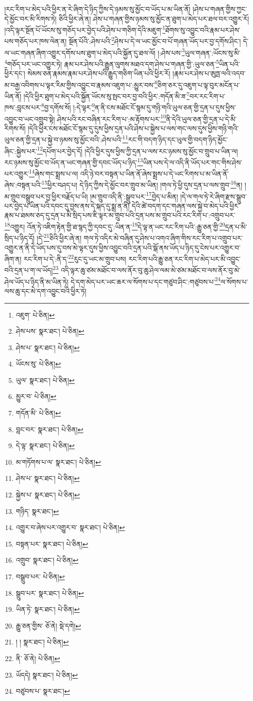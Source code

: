 །རང་རིག་པ་མེད་པའི་ཕྱིར་ན་རེ་ཞིག་དེ་ཉིད་ཀྱིས་དེ་ཉམས་སུ་མྱོང་བ་ཡོད་པ་མ་ཡིན་ནོ། །ཤེས་པ་གཞན་གྱིས་ཀྱང་དེ་མྱོང་བར་མི་རིགས་ཏེ། ཅིའི་ཕྱིར་ཞེ་ན། ཤེས་པ་གཞན་གྱིས་ཉམས་སུ་མྱོང་ན་ཐུག་པ་མེད་པར་ཐལ་བར་འགྱུར་རོ། །འདི་ལྟར་སྔོན་པོ་ཡོངས་སུ་གཅོད་པར་བྱེད་པའི་ཤེས་པ་གཅིག་དེའི་མཇུག་\footnote{འཇུག་  པེ་ཅིན། }ཐོགས་སུ་འབྱུང་བའི་རྣམ་པར་ཤེས་པས་གཅོད་པར་ཁས་ལེན་ན། སྔོན་པོའི་:ཤེས་པའི་\footnote{ཤེས་པས་  སྣར་ཐང་།  པེ་ཅིན། }ཤེས་པ་དེ་ལ་ཡང་མྱོང་བ་པོ་གཞན་ཡོད་པར་བྱ་དགོས་ཤིང་། དེ་ལ་ཡང་གཞན་ཞིག་འགྱུར་དགོས་པས་ཐུག་པ་མེད་པའི་སྐྱོན་དུ་ཐལ་ལོ། །:ཤེས་པས་\footnote{ཤེས་པ་  སྣར་ཐང་།  པེ་ཅིན། }ཡུལ་གཞན་:ཡོངས་སུ་མི་\footnote{ཡོངས་སུ་  པེ་ཅིན། }གཅོད་པར་ཡང་འགྱུར་ཏེ། རྣམ་པར་ཤེས་པའི་རྒྱུན་ལུགས་མཐའ་དག་ཤེས་པ་གཞན་གྱི་:ཡུལ་ཅན་\footnote{ཡུལ་  སྣར་ཐང་།  པེ་ཅིན། }ཡིན་པའི་ཕྱིར་དང་། སེམས་ཅན་རྣམས་རྣམ་པར་ཤེས་པའི་རྒྱུད་གཅིག་ཡིན་པའི་ཕྱིར་རོ། །རྣམ་པར་ཤེས་པ་ཨུཏྤ་ལའི་འདབ་མ་བརྒྱ་འབིགས་པ་ལྟར་རིམ་གྱིས་འབྱུང་བ་རྣམས་འཇུག་པ་:མྱུར་བས་\footnote{མྱུར་བ་  པེ་ཅིན། }ཅིག་ཅར་དུ་འཇུག་པ་ལྟ་བུར་མངོན་པ་ཡིན་ནོ། །དེའི་ཕྱིར་ཐུག་པ་མེད་པའི་སྐྱོན་ཡོངས་སུ་སྤང་བར་བྱ་བའི་ཕྱིར་:གདོན་མི་ཟ་\footnote{གདོན་མི་  པེ་ཅིན། }བར་རང་རིག་པ་ཁས་:བླངས་པར་\footnote{བླང་བར་  སྣར་ཐང་།  པེ་ཅིན། }བྱ་དགོས་སོ། །:དེ་ལྟར་\footnote{དེ་ལྟ་  སྣར་ཐང་།  པེ་ཅིན། }ན་ནི་ངས་མཐོང་ངོ་སྙམ་དུ་གཉི་གའི་ཡུལ་ཅན་གྱི་དྲན་པ་དུས་ཕྱིས་འབྱུང་བ་ཡང་འགྲུབ་སྟེ། ཤེས་པའི་རང་བཞིན་རང་རིག་པ་:མ་རྟོགས་པར་\footnote{མ་གཏོགས་པ་ལ་  སྣར་ཐང་།  པེ་ཅིན། }ནི་དེའི་ཡུལ་ཅན་གྱི་དྲན་པ་དེ་མི་རིགས་སོ། །དེའི་ཕྱིར་ངས་མཐོང་ངོ་སྙམ་དུ་དུས་ཕྱིས་དྲན་པའི་ཤེས་པ་སྐྱེས་པ་ལས་གང་ལས་དུས་ཕྱིས་གཉི་གའི་ཡུལ་ཅན་གྱི་དྲན་པ་སྐྱེ་བ་ཉམས་སུ་མྱོང་བའི་:ཤེས་པའི་\footnote{ཤེས་པ་  སྣར་ཐང་།  པེ་ཅིན། }རང་གི་བདག་ཉིད་དང་ཡུལ་གྱི་བདག་ཉིད་མྱོང་ཞིང་:སྐྱེས་པར་\footnote{སྐྱེས་པ་  སྣར་ཐང་།  པེ་ཅིན། }དཔོག་པར་བྱེད་དོ། །དེའི་ཕྱིར་དུས་ཕྱིས་ཀྱི་དྲན་པ་ལས་རང་ཉམས་སུ་མྱོང་བ་གྲུབ་པ་ཡིན་ལ། རང་ཉམས་སུ་མྱོང་བ་ཡོད་ན་ཡང་གཞན་གྱི་དབང་ཡོད་པ་ཉིད་\footnote{གཉིད་  སྣར་ཐང་། }ཡིན་པས་དེ་ལ་འདི་ནི་ཡོད་པར་གང་གིས་ཤེས་པར་འགྱུར་\footnote{འགྱུར་བ་ཞེས་པར་འགྱུར་བ་  སྣར་ཐང་།  པེ་ཅིན། }ཞེས་གང་སྨྲས་པ་ལ། འདི་ཉེ་བར་བསྟན་པ་ཡིན་ནོ་ཞེས་སྨྲས་པ་དེ་ཡང་རིགས་པ་མ་ཡིན་ནོ་ཞེས་:བསྟན་པའི་\footnote{བསྟན་པར་  སྣར་ཐང་།  པེ་ཅིན། }ཕྱིར་བཤད་པ། དེ་ཉིད་ཀྱིས་དེ་མྱོང་བར་གྲུབ་མ་ཡིན། །གལ་ཏེ་ཕྱི་དུས་དྲན་པ་ལས་གྲུབ་\footnote{འགྲུབ་  སྣར་ཐང་།  པེ་ཅིན། }ན། །མ་གྲུབ་བསྒྲུབ་པར་བྱ་ཕྱིར་བརྗོད་པ་ཡི། །མ་གྲུབ་འདི་ནི་:སྒྲུབ་པར་\footnote{བསྒྲུབ་པར་  པེ་ཅིན། }བྱེད་པ་མིན། །དེ་ལ་གལ་ཏེ་རེ་ཞིག་རྫས་སྒྲུབ་པར་བྱེད་པ་ཡིན་པའི་དབང་དུ་བྱས་ནས་དེ་སྐད་དུ་སྨྲ་ན་ནི། དེའི་ཚེ་བདག་དང་གཞན་ལས་སྐྱེ་བ་མེད་པའི་ཕྱིར་རྣམ་པ་ཐམས་ཅད་དུ་དྲན་པ་མི་སྲིད་པས་ཇི་ལྟར་མ་གྲུབ་པའི་དྲན་པས་མ་གྲུབ་པའི་རང་རིག་པ་:འགྲུབ་པར་\footnote{སྒྲུབ་པར་  སྣར་ཐང་།  པེ་ཅིན། }འགྱུར། འོན་ཏེ་འཇིག་རྟེན་གྱི་ཐ་སྙད་ཀྱི་དབང་དུ་:ཡིན་ན་\footnote{ཡིན་ཏེ་  སྣར་ཐང་།  པེ་ཅིན། }དེ་ལྟ་ན་ཡང་རང་རིག་པའི་:རྒྱུ་ཅན་གྱི་\footnote{རྒྱུ་ཅན་གྱིས་  ཅོ་ནེ།  སྡེ་དགེ། }དྲན་པ་མི་སྲིད་པ་ཉིད་དོ། །དེ་\footnote{། །  སྣར་ཐང་།  པེ་ཅིན། }ཅིའི་ཕྱིར་ཞེ་ན། གལ་ཏེ་འདིར་མེ་བཞིན་དུ་ཤེས་པ་འགའ་ཞིག་གིས་རང་རིག་པ་འགྲུབ་པར་འགྱུར་ན་ནི་དེ་ཡོད་པས་དུ་བས་མེ་ལྟར་དུས་ཕྱིས་འབྱུང་བའི་དྲན་པའི་སྒོ་ནས་ཡོད་པ་ཉིད་དུ་ངེས་པར་འགྱུར་བ་ཞིག་ན། རང་རིག་པ་དེ་:ནི་ད་\footnote{ནི་  ཅོ་ནེ།  པེ་ཅིན། }རུང་དུ་ཡང་མ་གྲུབ་པས། རང་རིག་པའི་རྒྱུ་ཅན་རང་རིག་པ་མེད་པར་མི་འབྱུང་བའི་དྲན་པ་ག་ལ་ཡོད།\footnote{ཡོདདེ།  སྣར་ཐང་།  པེ་ཅིན། } འདི་ལྟར་ཆུ་ཙམ་མཐོང་བ་ལས་ནོར་བུ་ཆུ་ཤེལ་ལམ་མེ་ཙམ་མཐོང་བ་ལས་ནོར་བུ་མེ་ཤེལ་ཡོད་པ་ཉིད་ནི་མ་ཡིན་ཏེ། དེ་དག་མེད་པར་ཡང་ཆར་ལ་སོགས་པ་དང་གཙུབ་ཤིང་:གཙུབས་པ་\footnote{བཙུབས་པ་  སྣར་ཐང་། }ལ་སོགས་པ་ལས་ཆུ་དང་མེ་དག་འབྱུང་བའི་ཕྱིར་ཏེ། 